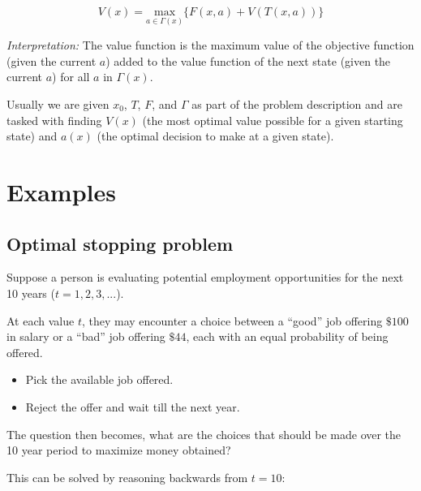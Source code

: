 \documentclass[a4paper, 12pt]{article}
\begin{document}
\[
  V(x) = \underset{a \in \Gamma(x)}{\text{max}}\{F(x, a) + V(T(x, a))\}
\]

\emph{Interpretation:} The value function is the maximum value of
the objective function (given the current $a$) added to the value
function of the next state (given the current $a$) for all $a$ in
$\Gamma(x)$.

Usually we are given $x_0$, $T$, $F$, and $\Gamma$ as part of the
problem description and are tasked with finding $V(x)$ (the most
optimal value possible for a given starting state) and $a(x)$ (the
optimal decision to make at a given state).

\section{Examples}

\subsection{Optimal stopping problem}

Suppose a person is evaluating potential employment opportunities
for the next 10 years ($t = 1, 2, 3, ...$).

At each value $t$, they may encounter a choice between a ``good''
job offering $\$100$ in salary or a ``bad'' job offering $\$44$,
each with an equal probability of being offered. 

\begin{itemize}
  \item Pick the available job offered.
  \item Reject the offer and wait till the next year.
\end{itemize}

The question then becomes, what are the choices that should be
made over the 10 year period to maximize money obtained?

This can be solved by reasoning backwards from $t=10$:
\end{document}
